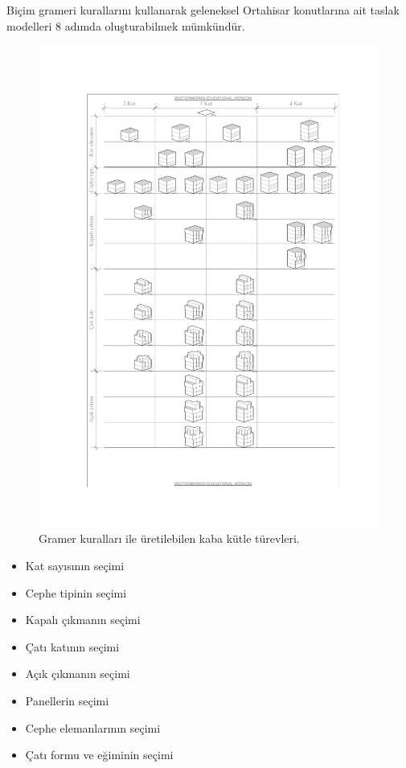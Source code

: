 \documentclass[12pt,turkish,a4paperpaper,]{report}
\providecommand{\tightlist}{%
  \setlength{\itemsep}{0pt}\setlength{\parskip}{0pt}}
\begin{document}
Biçim grameri kurallarını kullanarak geleneksel Ortahisar konutlarına
ait taslak modelleri 8 adımda oluşturabilmek mümkündür.

\begin{figure}
\centering
\includegraphics[width=1\textwidth,height=\textheight]{source/figures/kutleTurevleri.pdf}
\caption{Gramer kuralları ile üretilebilen kaba kütle türevleri.
\label{kutleTurev}}
\end{figure}

\begin{itemize}
\tightlist
\item
  Kat sayısının seçimi
\item
  Cephe tipinin seçimi
\item
  Kapalı çıkmanın seçimi
\item
  Çatı katının seçimi
\item
  Açık çıkmanın seçimi
\item
  Panellerin seçimi
\item
  Cephe elemanlarının seçimi
\item
  Çatı formu ve eğiminin seçimi
\end{itemize}
\end{document}
